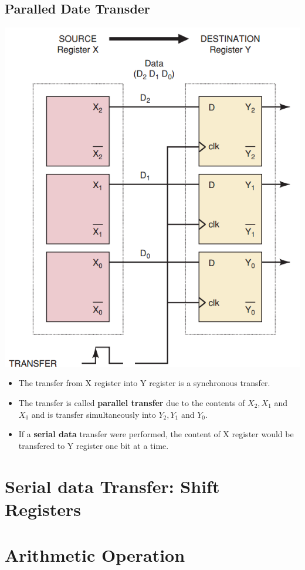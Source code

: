 \documentclass[12pt]{article}
\begin{document}
\subsection{Paralled Date Transder}
\includegraphics[scale = 0.6]{hinh20} \\
\begin{itemize}
	\item The transfer from X register into Y register is a synchronous transfer. \\
	\item The transfer is called \textbf{parallel transfer} due to the contents of $X_2 , X_1$ and $X_0$ and is transfer simultaneously into $Y_2, Y_1$ and $Y_0$.
	\item If a \textbf{serial data} transfer were performed, the content of X register would be transfered to Y register one bit at a time.
\end{itemize}
\section{Serial data Transfer: Shift Registers}
\bigbreak

\section{Arithmetic Operation}
\end{document}

